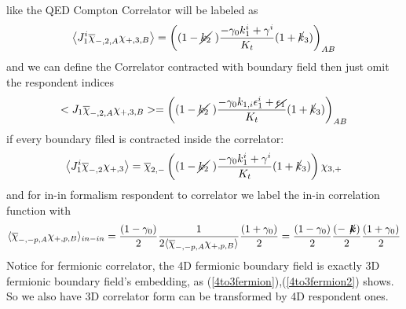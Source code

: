 \documentclass[11pt,a4paper]{article}
\begin{document}
like the QED Compton Correlator will be labeled as
\begin{equation}
\left<  {J}_{1}^{i}\overline{\chi}_{-,2,A} \chi_{+,3,B}\right> =\left( (1-\cancel{ {k_{2}}} \ )\frac{-\gamma _{0} {k}_{1}^{i} + {\gamma }^{i}}{K_{t}} (1+\cancel{ {k}}_{3} )\right)_{AB}
\end{equation}
and we can define the Correlator contracted with boundary field then just omit the respondent indices
\begin{equation}
<  {J}_{1}\overline{\chi}_{-,2,A} \chi_{+,3,B}> =\left( (1-\cancel{ {k_{2}}} \ )\frac{-\gamma _{0} {k}_{1,i}   {\epsilon }_{1}^i +\cancel{ {\epsilon _{1}}}}{K_{t}} (1+\cancel{ {k}}_{3} )\right)_{AB}
\end{equation}
if every boundary filed is contracted inside the correlator:
\begin{equation}
\left<  {J}_{1}^{i}\overline{\chi}_{-,2} \chi_{+,3}\right> =\overline{\chi}_{2,-}\left( (1-\cancel{ {k_{2}}} \ )\frac{-\gamma _{0} {k}_{1}^{i} + {\gamma }^{i}}{K_{t}} (1+\cancel{ {k}}_{3} )\right) \chi_{3,+}
\end{equation}
and for in-in formalism respondent to correlator we label the in-in correlation function with
\begin{equation}
\langle \overline{\chi}_{-,-p,A} \chi_{+,p,B} \rangle _{in-in} =\frac{( 1-\gamma _{0})}{2}\frac{1}{2\langle \overline{\chi}_{-,-p,A} \chi_{+,p,B} \rangle }\frac{( 1+\gamma _{0})}{2} =\frac{( 1-\gamma _{0})}{2}\frac{(-\not\!{{\boldsymbol{k}}})}{2}\frac{( 1+\gamma _{0})}{2}
\end{equation}
Notice for fermionic correlator, the 4D fermionic boundary field is exactly 3D fermionic boundary field's embedding, as (\ref{4to3fermion}),(\ref{4to3fermion2}) shows. So we also have 3D correlator form can be transformed by 4D respondent ones.
\end{document}
